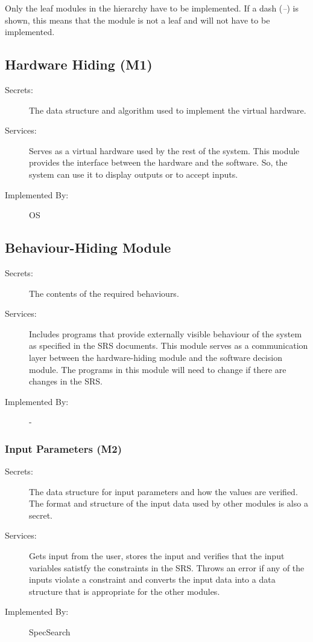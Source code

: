 \documentclass[12pt, titlepage]{article}
\begin{document}
Only the leaf modules in the hierarchy have to be implemented. If a dash
(\emph{--}) is shown, this means that the module is not a leaf and will not have
to be implemented.


\subsection{Hardware Hiding (M1)}

\begin{description}
\item[Secrets:]The data structure and algorithm used to implement the virtual
  hardware.
\item[Services:]Serves as a virtual hardware used by the rest of the
  system. This module provides the interface between the hardware and the
  software. So, the system can use it to display outputs or to accept inputs.
\item[Implemented By:] OS
\end{description}

\subsection{Behaviour-Hiding Module }

\begin{description}
\item[Secrets:]The contents of the required behaviours.
\item[Services:]Includes programs that provide externally visible behaviour of
  the system as specified in the SRS
  documents. This module serves as a communication layer between the
  hardware-hiding module and the software decision module. The programs in this
  module will need to change if there are changes in the SRS.
\item[Implemented By:] -
\end{description}

\subsubsection{Input Parameters (M2)}

\begin{description}
	\item[Secrets:] The data structure for input parameters and how the values 
	are verified. The format and structure of the 
	input data used by other modules is also a secret.
	\item[Services:] Gets input from the user, stores the input and verifies 
	that 
	the input variables satistfy the constraints in the SRS. Throws an error if 
	any of 
	the inputs violate a constraint and converts the input data into a data 
	structure that is 
	appropriate for the other 
	modules. 
	\item[Implemented By:]SpecSearch 
\end{description} 
\end{document}

